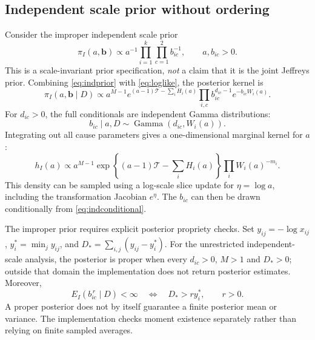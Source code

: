 \documentclass[a4paper,11pt]{article}
\begin{document}
\subsection{Independent scale prior without ordering}\label{sec:bayes-independent}
Consider the improper independent scale prior
\begin{equation}\label{eq:indprior}
\pi_I(a,\mathbf b)\propto a^{-1}\prod_{i=1}^k\prod_{c=1}^2 b_{ic}^{-1},\qquad a,b_{ic}>0.
\end{equation}
This is a scale-invariant prior specification, \emph{not} a claim that it is the joint Jeffreys prior. Combining \eqref{eq:indprior} with \eqref{eq:loglike}, the posterior kernel is
\begin{equation}\label{eq:indpost}
\pi_I(a,\mathbf b\mid D)\propto a^{M-1}e^{(a-1)\mathcal{T}-\sum_iH_i(a)}\prod_{i,c}b_{ic}^{d_{ic}-1}e^{-b_{ic}W_i(a)}.
\end{equation}
For $d_{ic}>0$, the full conditionals are independent Gamma distributions:
\begin{equation}\label{eq:indconditional}
b_{ic}\mid a,D\sim\operatorname{Gamma}(d_{ic},W_i(a)).
\end{equation}
Integrating out all cause parameters gives a one-dimensional marginal kernel for $a$:
\begin{equation}\label{eq:indmarginal}
\boxed{h_I(a)\propto a^{M-1}\exp\!\left\{(a-1)\mathcal{T}-\sum_iH_i(a)\right\}\prod_i W_i(a)^{-m_i}.}
\end{equation}
This density can be sampled using a log-scale slice update for $\eta=\log a$, including the transformation Jacobian $e^\eta$. The $b_{ic}$ can then be drawn conditionally from \eqref{eq:indconditional}.

The improper prior requires explicit posterior propriety checks. Set $y_{ij}=-\log x_{ij}$, $y_i^*=\min_j y_{ij}$, and $D_*=\sum_{i,j}(y_{ij}-y_i^*)$. For the unrestricted independent-scale analysis, the posterior is proper when every $d_{ic}>0$, $M>1$ and $D_*>0$; outside that domain the implementation does not return posterior estimates. Moreover,
\begin{equation}\label{eq:indmoments}
E_I(b_{ic}^{\,r}\mid D)<\infty\quad\Longleftrightarrow\quad D_*>r y_i^*,\qquad r>0.
\end{equation}
A proper posterior does not by itself guarantee a finite posterior mean or variance. The implementation checks moment existence separately rather than relying on finite sampled averages.
\end{document}

